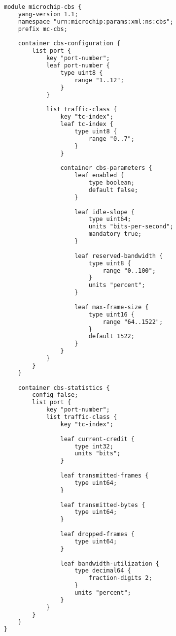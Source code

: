 \documentclass[10pt, journal, compsoc]{IEEEtran}
\begin{document}
\begin{lstlisting}[language=XML, caption=CBS YANG Model Extract]
module microchip-cbs {
    yang-version 1.1;
    namespace "urn:microchip:params:xml:ns:cbs";
    prefix mc-cbs;
    
    container cbs-configuration {
        list port {
            key "port-number";
            leaf port-number {
                type uint8 {
                    range "1..12";
                }
            }
            
            list traffic-class {
                key "tc-index";
                leaf tc-index {
                    type uint8 {
                        range "0..7";
                    }
                }
                
                container cbs-parameters {
                    leaf enabled {
                        type boolean;
                        default false;
                    }
                    
                    leaf idle-slope {
                        type uint64;
                        units "bits-per-second";
                        mandatory true;
                    }
                    
                    leaf reserved-bandwidth {
                        type uint8 {
                            range "0..100";
                        }
                        units "percent";
                    }
                    
                    leaf max-frame-size {
                        type uint16 {
                            range "64..1522";
                        }
                        default 1522;
                    }
                }
            }
        }
    }
    
    container cbs-statistics {
        config false;
        list port {
            key "port-number";
            list traffic-class {
                key "tc-index";
                
                leaf current-credit {
                    type int32;
                    units "bits";
                }
                
                leaf transmitted-frames {
                    type uint64;
                }
                
                leaf transmitted-bytes {
                    type uint64;
                }
                
                leaf dropped-frames {
                    type uint64;
                }
                
                leaf bandwidth-utilization {
                    type decimal64 {
                        fraction-digits 2;
                    }
                    units "percent";
                }
            }
        }
    }
}
\end{lstlisting}
\end{document}
